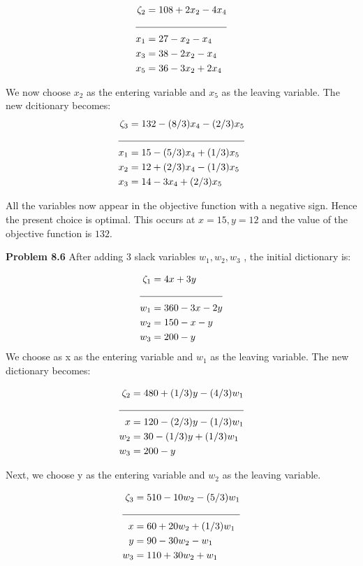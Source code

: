 \documentclass[letterpaper,12pt]{article}
\theoremstyle{definition}
\begin{document}
\begin{align*}
  \zeta_2 &= 108 + 2x_2 -4x_4\\
  \cline{1-2}
  x_1 &= 27 - x_2 - x_4\\
  x_3 &= 38- 2x_2-x_4\\
  x_5 &= 36 - 3x_2 + 2x_4\\
\end{align*}

We now choose $x_2$ as the entering variable and $x_5$ as the leaving variable. The new dcitionary becomes:
\begin{align*}
  \zeta_3 &= 132 -(8/3)x_4-(2/3)x_5\\
  \cline{1-2}
  x_1 &= 15-(5/3)x_4+(1/3)x_5\\
  x_2 &= 12+(2/3)x_4-(1/3)x_5\\
  x_3 &= 14-3x_4+(2/3)x_5 \\
\end{align*}

All the variables now appear in the objective function with a negative sign. Hence the present choice is optimal.
This occurs at $x=15, y=12$ and the value of the objective function is $132$.

\vspace{2mm}
\noindent\textbf{Problem 8.6} After adding 3 slack variables $w_1, w_2, w_3$ , the initial dictionary is:

\begin{align*}
  \zeta_1 &= 4x+3y\\
  \cline{1-2}
  w_1 &= 360-3x-2y\\
  w_2&= 150-x-y\\
  w_3 &= 200-y \\
\end{align*}
We choose as x as the entering variable and $w_1$ as the leaving variable. The new dictionary becomes:

\begin{align*}
  \zeta_2 &= 480 + (1/3)y -(4/3)w_1\\
  \cline{1-2}
  x &= 120 -(2/3)y - (1/3)w_1\\
  w_2&= 30-(1/3)y+(1/3)w_1\\
  w_3 &= 200-y \\
\end{align*}

Next, we choose y as the entering variable and $w_2$ as the leaving variable.

\begin{align*}
  \zeta_3 &= 510 -10w_2 - (5/3)w_1\\
  \cline{1-2}
  x &= 60 + 20w_2+(1/3)w_1\\
  y &= 90 - 30w_2-w_1\\
  w_3 &= 110+30w_2+w_1 \\
\end{align*}
\end{document}
